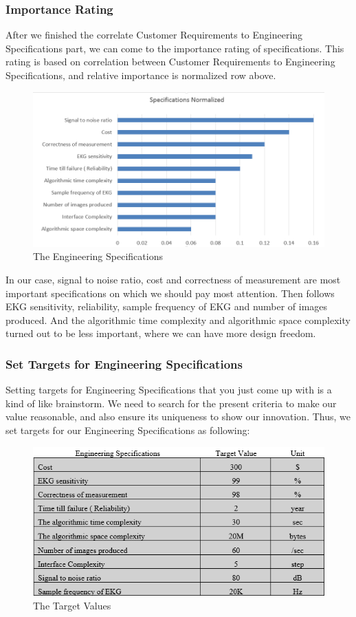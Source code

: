 \documentclass[paper=letter, fontsize=11pt]{scrartcl}
\numberwithin{equation}{section}		%
\numberwithin{figure}{section}			%
\numberwithin{table}{section}			%
\begin{document}
\subsubsection{Importance Rating}
After we finished the correlate Customer Requirements to Engineering Specifications part, we can come to the importance rating of specifications. This rating is based on correlation between Customer Requirements to Engineering Specifications, and relative importance is normalized row above. 

\begin{figure}[H]
    \centering
	\includegraphics[scale=0.7]{zhentmfan.png}
	\caption{The Engineering Specifications}
\end{figure}

In our case, signal to noise ratio, cost and correctness of measurement are most important specifications on which we should pay most attention. Then follows EKG sensitivity, reliability, sample frequency of EKG and number of images produced. And the algorithmic time complexity and algorithmic space complexity turned out to be less important, where we can have more design freedom.
\subsubsection{Set Targets for Engineering Specifications}
Setting targets for Engineering Specifications that you just come up with is a kind of like brainstorm. We need to search for the present criteria to make our value reasonable, and also ensure its uniqueness to show our innovation. Thus, we set targets for our Engineering Specifications as following:

\begin{figure}[H]
	\centering
	\includegraphics[scale=1]{target.png}
	\caption{The Target Values}
\end{figure}
\end{document}
